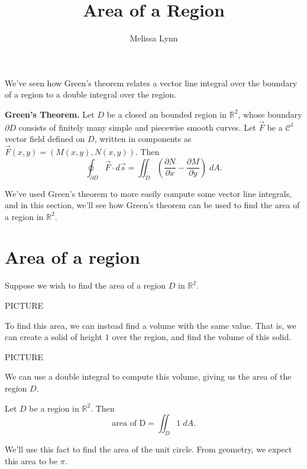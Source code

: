 \documentclass{ximera}
\title{Area of a Region}
\author{Melissa Lynn}
\begin{document}
  
\begin{abstract}  
\end{abstract}  
\maketitle  

We've seen how Green's theorem relates a vector line integral over the boundary of a region to a double integral over the region.

\begin{theorem}
\textbf{Green's Theorem.} Let $D$ be a closed an bounded region in $\mathbb{R}^2$, whose boundary $\partial D$ consists of finitely many simple and piecewise smooth curves. Let $\vec{F}$ be a $\mathcal{C}^1$ vector field defined on $D$, written in components as $\vec{F}(x,y) = (M(x,y), N(x,y))$. Then
\[
\oint_{\partial D}\vec{F}\cdot d\vec{s} = \iint_D \left(\frac{\partial N}{\partial x} - \frac{\partial M}{\partial y}\right)\;dA.
\]
\end{theorem}

We've used Green's theorem to more easily compute some vector line integrals, and in this section, we'll see how Green's theorem can be used to find the area of a region in $\mathbb{R}^2$.

\section*{Area of a region}

Suppose we wish to find the area of a region $D$ in $\mathbb{R}^2$.

PICTURE

To find this area, we can instead find a volume with the same value. That is, we can create a solid of height $1$ over the region, and find the volume of this solid.

PICTURE

We can use a double integral to compute this volume, giving us the area of the region $D$.

\begin{proposition}
Let $D$ be a region in $\mathbb{R}^2$. Then
\[
\text{area of D} = \iint_D 1\;dA.
\]
\end{proposition}

We'll use this fact to find the area of the unit circle. From geometry, we expect this area to be $\pi$.
\end{document}
